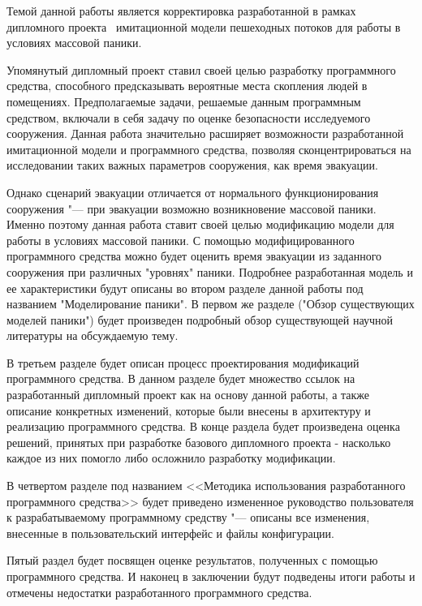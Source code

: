 
\label{sec:intro}

Темой данной работы является корректировка разработанной в рамках дипломного проекта~\cite{my_diploma} имитационной модели пешеходных потоков для работы в условиях массовой паники.

Упомянутый дипломный проект ставил своей целью разработку программного средства, способного предсказывать вероятные места скопления людей в помещениях.
Предполагаемые задачи, решаемые данным программным средством, включали в себя задачу по оценке безопасности исследуемого сооружения.
Данная работа значительно расширяет возможности разработанной имитационной модели и программного средства, позволяя сконцентрироваться на исследовании таких важных параметров сооружения, как время эвакуации.

Однако сценарий эвакуации отличается от нормального функционирования сооружения "--- при эвакуации возможно возникновение массовой паники.
Именно поэтому данная работа ставит своей целью модификацию модели для работы в условиях массовой паники.
С помощью модифицированного программного средства можно будет оценить время эвакуации из заданного сооружения при различных "уровнях" паники.
Подробнее разработанная модель и ее характеристики будут описаны во втором разделе данной работы под названием "Моделирование паники".
В первом же разделе ("Обзор существующих моделей паники") будет произведен подробный обзор существующей научной литературы на обсуждаемую тему.

В третьем разделе будет описан процесс проектирования модификаций программного средства.
В данном разделе будет множество ссылок на разработанный дипломный проект как на основу данной работы, а также описание конкретных изменений, которые были внесены в архитектуру и реализацию программного средства.
В конце раздела будет произведена оценка решений, принятых при разработке базового дипломного проекта - насколько каждое из них помогло либо осложнило разработку модификации.

В четвертом разделе под названием <<Методика использования разработанного программного средства>> будет приведено измененное руководство пользователя к разрабатываемому программному средству
"--- описаны все изменения, внесенные в пользовательский интерфейс и файлы конфигурации.

Пятый раздел будет посвящен оценке результатов, полученных с помощью программного средства.
И наконец в заключении будут подведены итоги работы и отмечены недостатки разработанного программного средства.
